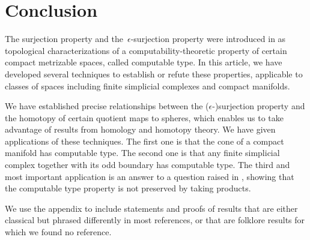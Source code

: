 \documentclass[english,11pt]{article}
\theoremstyle{plain}
\theoremstyle{remark}
\theoremstyle{definition}
\begin{document}
\section{Conclusion}\label{sec_conclusion}

The surjection property and the~$\epsilon$-surjection property were introduced in \cite{AH22} as topological characterizations of a computability-theoretic property of certain compact metrizable spaces, called computable type. In this article, we have developed several techniques to establish or refute these properties, applicable to classes of spaces including finite simplicial complexes and compact manifolds.

We have established precise relationships between the ($\epsilon$-)surjection property and the homotopy of certain quotient maps to spheres, which enables us to take advantage of results from homology and homotopy theory. We have given applications of these techniques. The first one is that the cone of a compact manifold has computable type. The second one is that any finite simplicial complex together with its odd boundary has computable type. The third and most important application is an answer to a question raised in \cite{CI21}, showing that the computable type property is not preserved by taking products.


%


 


\newpage
\appendix

We use the appendix to include statements and proofs of results that are either classical but phrased differently in most references, or that are folklore results for which we found no reference.
\end{document}
